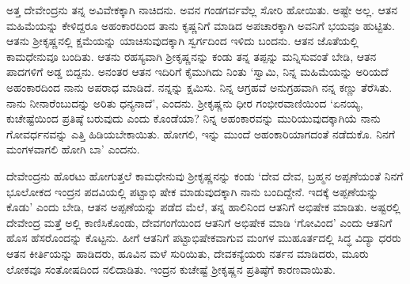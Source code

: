 ಅತ್ತ ದೇವೇಂದ್ರನು ತನ್ನ ಅವಿವೇಕಕ್ಕಾಗಿ ನಾಚಿದನು. ಅವನ ಗಂಡಗರ್ವವೆಲ್ಲ ಸೋರಿ ಹೋಯಿತು. ಅಷ್ಟೇ ಅಲ್ಲ. ಆತನ ಮಹಿಮೆಯನ್ನು ಕೇಳಿದ್ದರೂ ಅಹಂಕಾರದಿಂದ ತಾನು ಕೃಷ್ಣನಿಗೆ ಮಾಡಿದ ಅಪಚಾರಕ್ಕಾಗಿ ಅವನಿಗೆ ಭಯವೂ ಹುಟ್ಟಿತು. ಆತನು ಶ್ರೀಕೃಷ್ಣನಲ್ಲಿ ಕ್ಷಮೆಯನ್ನು ಯಾಚಿಸುವುದಕ್ಕಾಗಿ ಸ್ವರ್ಗದಿಂದ ಇಳಿದು ಬಂದನು. ಆತನ ಜೊತೆಯಲ್ಲಿ ಕಾಮಧೇನುವೂ ಬಂದಿತು. ಆತನು ರಹಸ್ಯವಾಗಿ ಶ್ರೀಕೃಷ್ಣನನ್ನು ಕಂಡು ತನ್ನ ತಪ್ಪನ್ನು ಮನ್ನಿಸುವಂತೆ ಬೇಡಿ, ಆತನ ಪಾದಗಳಿಗೆ ಅಡ್ಡ ಬಿದ್ದನು. ಅನಂತರ ಆತನ ಇದಿರಿಗೆ ಕೈಮುಗಿದು ನಿಂತು ‘ಸ್ವಾಮಿ, ನಿನ್ನ ಮಹಿಮೆಯನ್ನು ಅರಿಯದೆ ಅಹಂಕಾರದಿಂದ ನಾನು ಅಪರಾಧ ಮಾಡಿದೆ. ನನ್ನನ್ನು ಕ್ಷಮಿಸು. ನಿನ್ನ ಆಗ್ರಹವೆ ಅನುಗ್ರಹವಾಗಿ ನನ್ನ ಕಣ್ಣು ತೆರೆಸಿತು. ನಾನು ನೀನಾರೆಂಬುದನ್ನು ಅರಿತು ಧನ್ಯನಾದೆ’, ಎಂದನು. ಶ್ರೀಕೃಷ್ಣನು ಧೀರ ಗಂಭೀರವಾಣಿಯಿಂದ ‘ಏನಯ್ಯ, ಕುಚೇಷ್ಟೆಯಿಂದ ಪ್ರತಿಷ್ಠೆ ಬರುವುದು ಎಂದು ಕೊಂಡೆಯಾ? ನಿನ್ನ ಅಹಂಕಾರವನ್ನು ಮುರಿಯುವುದಕ್ಕಾಗಿಯೆ ನಾನು ಗೋವರ್ಧನವನ್ನು ಎತ್ತಿ ಹಿಡಿಯಬೇಕಾಯಿತು. ಹೋಗಲಿ, ಇನ್ನು ಮುಂದೆ ಅಹಂಕಾರಿಯಾಗದಂತೆ ನಡೆದುಕೊ. ನಿನಗೆ ಮಂಗಳವಾಗಲಿ ಹೋಗಿ ಬಾ’ ಎಂದನು.

ದೇವೇಂದ್ರನು ಹೊರಟು ಹೋಗುತ್ತಲೆ ಕಾಮಧೇನುವು ಶ್ರೀಕೃಷ್ಣನನ್ನು ಕಂಡು ‘ದೇವ ದೇವ, ಬ್ರಹ್ಮನ ಅಪ್ಪಣೆಯಂತೆ ನಿನಗೆ ಭೂಲೋಕದ ಇಂದ್ರನ ಪದವಿಯಲ್ಲಿ ಪಟ್ಟಾಭಿ ಷೇಕ ಮಾಡುವುದಕ್ಕಾಗಿ ನಾನು ಬಂದಿದ್ದೇನೆ. ಇದಕ್ಕೆ ಅಪ್ಪಣೆಯನ್ನು ಕೊಡು’ ಎಂದು ಬೇಡಿ, ಆತನ ಅಪ್ಪಣೆಯನ್ನು ಪಡೆದ ಮೆಲೆ, ತನ್ನ ಹಾಲಿನಿಂದ ಆತನಿಗೆ ಅಭಿಷೇಕ ಮಾಡಿತು. ಅಷ್ಟರಲ್ಲಿ ದೇವೇಂದ್ರ ಮತ್ತೆ ಅಲ್ಲಿ ಕಾಣಿಸಿಕೊಂಡು, ದೇವಗಂಗೆಯಿಂದ ಆತನಿಗೆ ಅಭಿಷೇಕ ಮಾಡಿ ‘ಗೋವಿಂದ’ ಎಂದು ಆತನಿಗೆ ಹೊಸ ಹೆಸರೊಂದನ್ನು ಕೊಟ್ಟನು. ಹೀಗೆ ಆತನಿಗೆ ಪಟ್ಟಾಭಿಷೇಕವಾಗುವ ಮಂಗಳ ಮುಹೂರ್ತದಲ್ಲಿ ಸಿದ್ಧ ವಿದ್ಯಾ ಧರರು ಆತನ ಕೀರ್ತಿಯನ್ನು ಹಾಡಿದರು, ಹೂವಿನ ಮಳೆ ಸುರಿಯಿತು, ದೇವಕನ್ಯೆಯರು ನರ್ತನ ಮಾಡಿದರು, ಮೂರು ಲೋಕವೂ ಸಂತೋಷದಿಂದ ನಲಿದಾಡಿತು. ಇಂದ್ರನ ಕುಚೇಷ್ಟೆ ಶ್ರೀಕೃಷ್ಣನ ಪ್ರತಿಷ್ಠೆಗೆ ಕಾರಣವಾಯಿತು.

